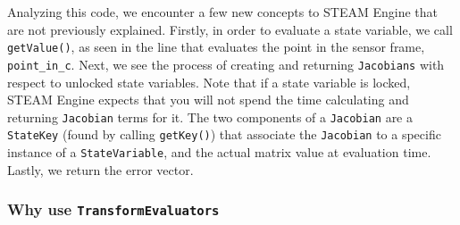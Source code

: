 \documentclass[10pt,letterpaper,fleqn,oneside]{article}
\newcommand{\code}[1]{\texttt{#1}}
\begin{document}
Analyzing this code, we encounter a few new concepts to STEAM Engine that are not previously explained.
Firstly, in order to evaluate a state variable, we call \code{getValue()}, as seen in the line that evaluates the point in the sensor frame, \code{point\_in\_c}.
Next, we see the process of creating and returning \code{Jacobians} with respect to unlocked state variables.
Note that if a state variable is locked, STEAM Engine expects that you will not spend the time calculating and returning \code{Jacobian} terms for it.
The two components of a \code{Jacobian} are a \code{StateKey} (found by calling \code{getKey()}) that associate the \code{Jacobian} to a specific instance of a \code{StateVariable}, and the actual matrix value at evaluation time. 
Lastly, we return the error vector.

\subsubsection{Why use \code{TransformEvaluators}}
\end{document}
